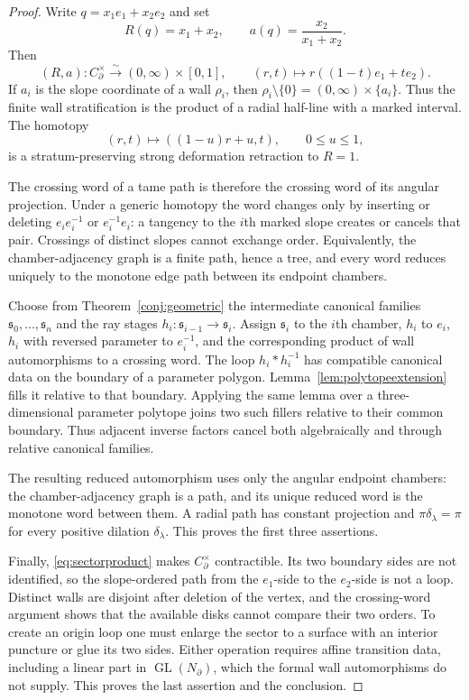 \documentclass[11pt]{amsart}
\theoremstyle{definition}
\theoremstyle{remark}
\begin{document}
\begin{proof}
Write $q=x_1e_1+x_2e_2$ and set
\[
 R(q)=x_1+x_2,
 \qquad
 a(q)=\frac{x_2}{x_1+x_2}.
\]
Then
\begin{equation}
\label{eq:sectorproduct}
 (R,a):C_\partial^\times\xrightarrow{\sim}(0,\infty)\times[0,1],
 \qquad
 (r,t)\longmapsto r((1-t)e_1+te_2).
\end{equation}
If $a_i$ is the slope coordinate of a wall $\rho_i$, then
$\rho_i\setminus\{0\}=(0,\infty)\times\{a_i\}$.  Thus the finite wall
stratification is the product of a radial half-line with a marked interval.
The homotopy
\[
 (r,t)\longmapsto((1-u)r+u,t),\qquad 0\le u\le1,
\]
is a stratum-preserving strong deformation retraction to $R=1$.

The crossing word of a tame path is therefore the crossing word of its angular
projection.  Under a generic homotopy the word changes only by inserting or
deleting $e_i e_i^{-1}$ or $e_i^{-1}e_i$: a tangency to the $i$th marked slope
creates or cancels that pair.  Crossings of distinct slopes cannot exchange
order.  Equivalently, the chamber-adjacency graph is a finite path, hence a
tree, and every word reduces uniquely to the monotone edge path between its
endpoint chambers.

Choose from Theorem~\ref{conj:geometric} the intermediate canonical families
$\mathfrak s_0,\ldots,\mathfrak s_n$ and the ray stages
$h_i:\mathfrak s_{i-1}\to\mathfrak s_i$.  Assign $\mathfrak s_i$ to the
$i$th chamber, $h_i$ to $e_i$, $h_i$ with reversed parameter to $e_i^{-1}$,
and the corresponding product of wall automorphisms to a crossing word.  The loop
$h_i*h_i^{-1}$ has compatible canonical data on the boundary of a parameter
polygon.  Lemma~\ref{lem:polytopeextension} fills it relative to that boundary.
Applying the same lemma over a three-dimensional parameter polytope joins two
such fillers relative to their common boundary.  Thus adjacent inverse factors
cancel both algebraically and through relative canonical families.

The resulting reduced automorphism uses only the angular endpoint chambers:
the chamber-adjacency graph is a path, and its unique reduced word is the
monotone word between them.  A radial path has constant projection and
$\pi\delta_\lambda=\pi$ for every positive dilation $\delta_\lambda$.
This proves the first three assertions.

Finally, \eqref{eq:sectorproduct} makes $C_\partial^\times$ contractible.  Its two boundary sides
are not identified, so the slope-ordered path from the $e_1$-side to the
$e_2$-side is not a loop.  Distinct walls are disjoint after deletion of the
vertex, and the crossing-word argument shows that the available disks cannot
compare their two orders.  To create an origin loop one must enlarge the sector
to a surface with an interior puncture or glue its two sides.  Either operation
requires affine transition data, including a linear part in
$\operatorname{GL}(N_\partial)$, which the formal wall automorphisms do not
supply.  This proves the last assertion and the conclusion.
\end{proof}
\end{document}
